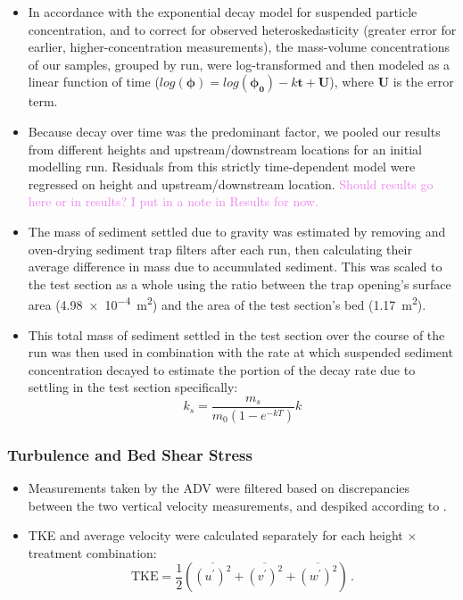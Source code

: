 \documentclass{article}
\begin{document}
\begin{itemize}
    \item In accordance with the exponential decay model for suspended particle concentration, and to correct for observed heteroskedasticity (greater error for earlier, higher-concentration measurements), the mass-volume concentrations of our samples, grouped by run, were log-transformed and then modeled as a linear function of time ($log(\bm{\phi}) = log(\bm{\phi_0}) - k\bm{t} + \bm{U}$), where $\bm{U}$ is the error term. 
    \item Because decay over time was the predominant factor, we pooled our results from different heights and upstream/downstream locations for an initial modelling run. Residuals from this strictly time-dependent model were regressed on height and upstream/downstream location. \textcolor{violet}{Should results go here or in results? I put in a note in Results for now.} 
    \item The mass of sediment settled due to gravity was estimated by removing and oven-drying sediment trap filters after each run, then calculating their average difference in mass due to accumulated sediment. This was scaled to the test section as a whole using the ratio between the trap opening's surface area (\SI{4.98e-4}{\metre^2}) and the area of the test section's bed (\SI{1.17}{\metre^2}). 
    \item This total mass of sediment settled in the test section over the course of the run was then used in combination with the rate at which suspended sediment concentration decayed to estimate the portion of the decay rate due to settling in the test section specifically:
    \begin{equation}
        k_s = \frac{m_s}{m_0(1-e^{-kT})}k
    \end{equation}
\end{itemize}

\subsubsection{Turbulence and Bed Shear Stress}

\begin{itemize}
    \item Measurements taken by the ADV were filtered based on discrepancies between the two vertical velocity measurements, and despiked according to \cite{goring_nikora}.
    \item TKE and average velocity were calculated separately for each height $\times$ treatment combination:
\begin{equation}
    \text{TKE} = \frac{1}{2}(\overline{(u^\prime)^2} + \overline{(v^\prime)^2} + \overline{(w^\prime)^2})\,.
    \label{eqn:TKE}
\end{equation}

\end{itemize}
\end{document}
